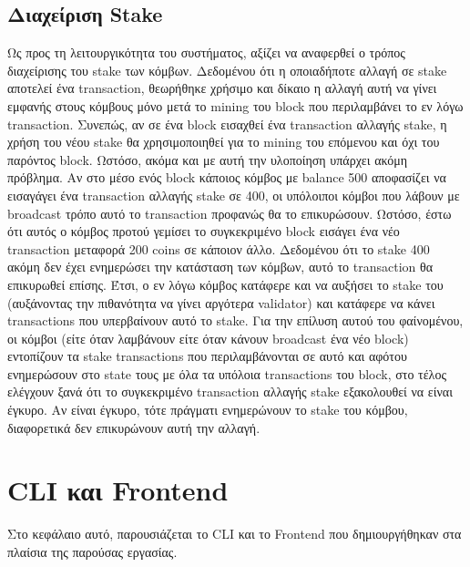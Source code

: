 \documentclass[12pt, a4paper]{article}
\begin{document}
	\subsection{Διαχείριση Stake}
	Ως προς τη λειτουργικότητα του συστήματος, αξίζει να αναφερθεί ο τρόπος διαχείρισης του stake των κόμβων. Δεδομένου ότι η οποιαδήποτε αλλαγή σε stake αποτελεί ένα transaction, θεωρήθηκε χρήσιμο και δίκαιο η αλλαγή αυτή να γίνει εμφανής στους κόμβους μόνο μετά το mining του block που περιλαμβάνει το εν λόγω transaction. Συνεπώς, αν σε ένα block εισαχθεί ένα transaction αλλαγής stake, η χρήση του νέου stake θα χρησιμοποιηθεί για το mining του επόμενου και όχι του παρόντος block. Ωστόσο, ακόμα και με αυτή την υλοποίηση υπάρχει ακόμη πρόβλημα. Αν στο μέσο ενός block κάποιος κόμβος με balance 500 αποφασίζει να εισαγάγει ένα transaction αλλαγής stake σε 400, οι υπόλοιποι κόμβοι που λάβουν με broadcast τρόπο αυτό το transaction προφανώς θα το επικυρώσουν. Ωστόσο, έστω ότι αυτός ο κόμβος προτού γεμίσει το συγκεκριμένο block εισάγει ένα νέο transaction μεταφορά 200 coins σε κάποιον άλλο. Δεδομένου ότι το stake 400 ακόμη δεν έχει ενημερώσει την κατάσταση των κόμβων, αυτό το transaction θα επικυρωθεί επίσης. Έτσι, ο εν λόγω κόμβος κατάφερε και να αυξήσει το stake του (αυξάνοντας την πιθανότητα να γίνει αργότερα validator) και κατάφερε να κάνει transactions που υπερβαίνουν αυτό το stake. Για την επίλυση αυτού του φαίνομένου, οι κόμβοι (είτε όταν λαμβάνουν είτε όταν κάνουν broadcast ένα νέο block) εντοπίζουν τα stake transactions που περιλαμβάνονται σε αυτό και αφότου ενημερώσουν στο state τους με όλα τα υπόλοια transactions του block, στο τέλος ελέγχουν ξανά ότι το συγκεκριμένο transaction αλλαγής stake εξακολουθεί να είναι έγκυρο. Αν είναι έγκυρο, τότε πράγματι ενημερώνουν το stake του κόμβου, διαφορετικά δεν επικυρώνουν αυτή την αλλαγή.  

	\section{CLI και Frontend}
	Στο κεφάλαιο αυτό, παρουσιάζεται το CLI και το Frontend που δημιουργήθηκαν στα πλαίσια της παρούσας εργασίας. 
\end{document}
